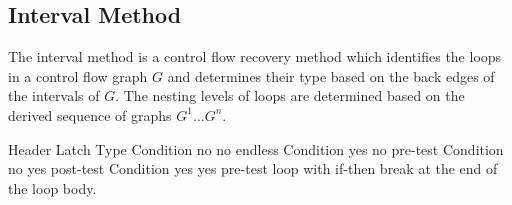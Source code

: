 
\subsection{Interval Method}
\label{sec:interval_method}


The interval method is a control flow recovery method which identifies the loops in a control flow graph $G$ and determines their type based on the back edges of the intervals of $G$. The nesting levels of loops are determined based on the derived sequence of graphs $G^1 \dots G^n$.







             Header   Latch    Type
Condition    no       no       endless
Condition    yes      no       pre-test
Condition    no       yes      post-test
Condition    yes      yes      pre-test loop with if-then break at the end of the loop body.




